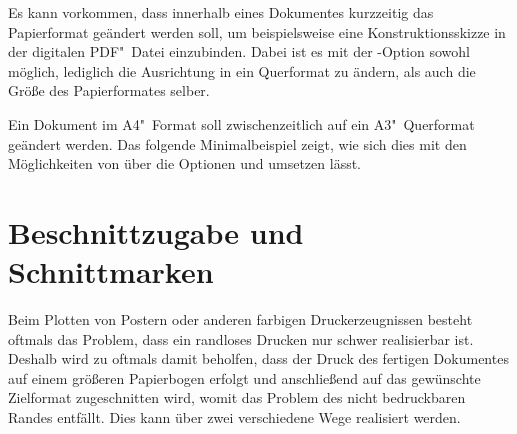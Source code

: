 Es kann vorkommen, dass innerhalb eines Dokumentes kurzzeitig das Papierformat 
geändert werden soll, um beispielsweise eine Konstruktionsskizze in der 
digitalen PDF"~Datei einzubinden. Dabei ist es mit der \KOMAScript-Option 
 sowohl möglich, lediglich die Ausrichtung in ein 
Querformat zu ändern, als auch die Größe des Papierformates selber.
%
\begin{Example}
Ein Dokument im A4"~Format soll zwischenzeitlich auf ein A3"~Querformat 
geändert werden. Das folgende Minimalbeispiel zeigt, wie sich dies mit den 
Möglichkeiten von \KOMAScript über die Optionen  und 
 umsetzen lässt.
\end{Example}



\section{%
  Beschnittzugabe und Schnittmarken%
  \label{sec:tips:crop}%
}

%
Beim Plotten von Postern oder anderen farbigen Druckerzeugnissen besteht 
oftmals das Problem, dass ein randloses Drucken nur schwer realisierbar ist. 
Deshalb wird zu oftmals damit beholfen, dass der Druck des fertigen Dokumentes 
auf einem größeren Papierbogen erfolgt und anschließend auf das gewünschte 
Zielformat zugeschnitten wird, womit das Problem des nicht bedruckbaren Randes 
entfällt. Dies kann über zwei verschiedene Wege realisiert werden.

